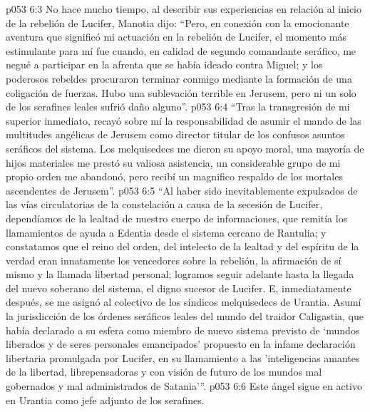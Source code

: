 \vs p053 6:3 \pc No hace mucho tiempo, al describir sus experiencias en relación al inicio de la rebelión de Lucifer, Manotia dijo: “Pero, en conexión con la emocionante aventura que significó mi actuación en la rebelión de Lucifer, el momento más estimulante para mí fue cuando, en calidad de segundo comandante seráfico, me negué a participar en la afrenta que se había ideado contra Miguel; y los poderosos rebeldes procuraron terminar conmigo mediante la formación de una coligación de fuerzas. Hubo una sublevación terrible en Jerusem, pero ni un solo de los serafines leales sufrió daño alguno”.
\vs p053 6:4 “Tras la transgresión de mi superior inmediato, recayó sobre mí la responsabilidad de asumir el mando de las multitudes angélicas de Jerusem como director titular de los confusos asuntos seráficos del sistema. Los melquisedecs me dieron su apoyo moral, una mayoría de hijos materiales me prestó su valiosa asistencia, un considerable grupo de mi propio orden me abandonó, pero recibí un magnifico respaldo de los mortales ascendentes de Jerusem”.
\vs p053 6:5 “Al haber sido inevitablemente expulsados de las vías circulatorias de la constelación a causa de la secesión de Lucifer, dependíamos de la lealtad de nuestro cuerpo de informaciones, que remitía los llamamientos de ayuda a Edentia desde el sistema cercano de Rantulia; y constatamos que el reino del orden, del intelecto de la lealtad y del espíritu de la verdad eran innatamente los vencedores sobre la rebelión, la afirmación de sí mismo y la llamada libertad personal; logramos seguir adelante hasta la llegada del nuevo soberano del sistema, el digno sucesor de Lucifer. E, inmediatamente después, se me asignó al colectivo de los síndicos melquisedecs de Urantia. Asumí la jurisdicción de los órdenes seráficos leales del mundo del traidor Caligastia, que había declarado a su esfera como miembro de nuevo sistema previsto de ‘mundos liberados y de seres personales emancipados' propuesto en la infame declaración libertaria promulgada por Lucifer, en su llamamiento a las 'inteligencias amantes de la libertad, librepensadoras y con visión de futuro de los mundos mal gobernados y mal administrados de Satania’”.
\vs p053 6:6 \pc Este ángel sigue en activo en Urantia como jefe adjunto de los serafines.
